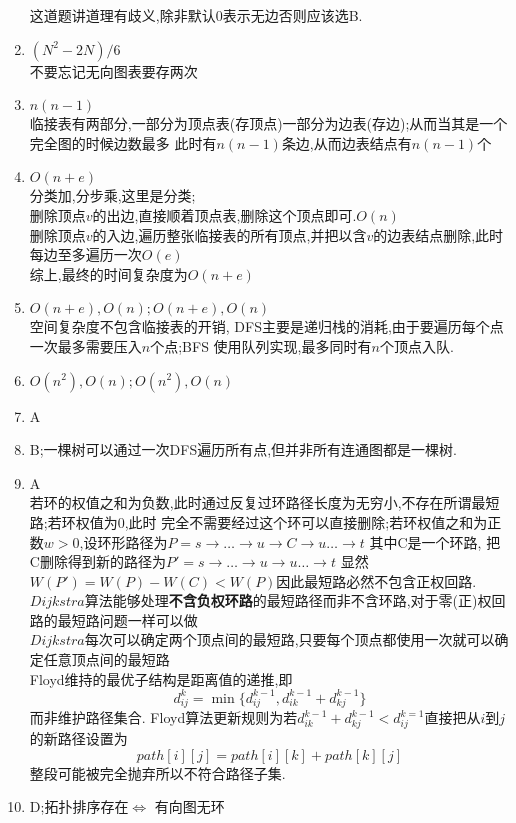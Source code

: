 \documentclass[12pt, a4paper, oneside, UTF8]{ctexbook}
\begin{document}
\begin{enumerate}[label=\arabic*.\textbf{答案}:]
    这道题讲道理有歧义,除非默认$0$表示无边否则应该选B. 
    \item $(N^2-2N)/6$ \\
    不要忘记无向图表要存两次 
    \item $n(n-1)$ \\
    临接表有两部分,一部分为顶点表(存顶点)一部分为边表(存边);从而当其是一个完全图的时候边数最多
    此时有$n(n-1)$条边,从而边表结点有$n(n-1)$个
    \item $O(n+e)$ \\
    分类加,分步乘,这里是分类;  \\
    删除顶点$v$的出边,直接顺着顶点表,删除这个顶点即可.$O(n)$ \\
    删除顶点$v$的入边,遍历整张临接表的所有顶点,并把以含$v$的边表结点删除,此时每边至多遍历一次$O(e)$ \\
    综上,最终的时间复杂度为$O(n+e)$
    \item $O(n+e),O(n);O(n+e),O(n)$ \\
    空间复杂度不包含临接表的开销, DFS主要是递归栈的消耗,由于要遍历每个点一次最多需要压入$n$个点;BFS
    使用队列实现,最多同时有$n$个顶点入队. 
    \item $O(n^2),O(n);O(n^2),O(n)$ 
    \item A 
    \item B;一棵树可以通过一次DFS遍历所有点,但并非所有连通图都是一棵树.
    \item A \\
    若环的权值之和为负数,此时通过反复过环路径长度为无穷小,不存在所谓最短路;若环权值为0,此时
    完全不需要经过这个环可以直接删除;若环权值之和为正数$w>0$,设环形路径为$P=s\rightarrow
    \ldots\rightarrow u\rightarrow C\rightarrow u\ldots\rightarrow t$ 其中C是一个环路,
    把C删除得到新的路径为$P'=s\rightarrow\ldots\rightarrow u\rightarrow u\ldots\rightarrow t$
    显然$W(P')=W(P)-W(C)<W(P)$因此最短路必然不包含正权回路.  \\
    $Dijkstra$算法能够处理\textbf{不含负权环路}的最短路径而非不含环路,对于零(正)权回路的最短路问题一样可以做 \\
    $Dijkstra$每次可以确定两个顶点间的最短路,只要每个顶点都使用一次就可以确定任意顶点间的最短路 \\
    Floyd维持的最优子结构是距离值的递推,即
    $$
    d_{ij}^{k} = \min\{d_{ij}^{k-1},d_{ik}^{k-1}+d_{kj}^{k-1}\}
    $$
    而非维护路径集合. Floyd算法更新规则为若$d_{ik}^{k-1}+d_{kj}^{k-1}<d_{ij}^{k=1}$直接把从$i$到$j$的新路径设置为
    $$
    path[i][j]=path[i][k]+path[k][j] 
    $$
    整段可能被完全抛弃所以不符合路径子集.
    \item D;拓扑排序存在$\iff$ 有向图无环

\end{enumerate}
\end{document}
